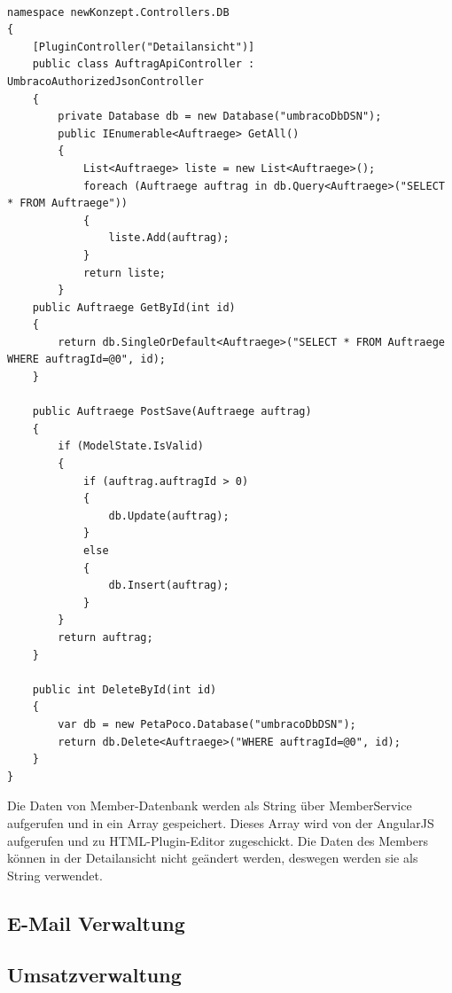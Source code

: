 \pagebreak
\begin{lstlisting}[caption={API-UmbracoAuthorizedJsonController}, label=lst:API-Controller]

namespace newKonzept.Controllers.DB
{
	[PluginController("Detailansicht")]
	public class AuftragApiController : UmbracoAuthorizedJsonController
	{
		private Database db = new Database("umbracoDbDSN");
		public IEnumerable<Auftraege> GetAll()
		{
			List<Auftraege> liste = new List<Auftraege>();
			foreach (Auftraege auftrag in db.Query<Auftraege>("SELECT * FROM Auftraege"))
			{
				liste.Add(auftrag);
			}
			return liste;
		}
	public Auftraege GetById(int id)
	{
		return db.SingleOrDefault<Auftraege>("SELECT * FROM Auftraege WHERE auftragId=@0", id);
	}

	public Auftraege PostSave(Auftraege auftrag)
	{
		if (ModelState.IsValid)
		{			
			if (auftrag.auftragId > 0)
			{
				db.Update(auftrag);
			}
			else
			{
				db.Insert(auftrag);
			}
		}
		return auftrag;
	}

	public int DeleteById(int id)
	{
		var db = new PetaPoco.Database("umbracoDbDSN");
		return db.Delete<Auftraege>("WHERE auftragId=@0", id);
	}
}
\end{lstlisting}

Die Daten von Member-Datenbank werden als String über MemberService aufgerufen und in ein Array gespeichert. Dieses Array wird von der AngularJS aufgerufen und zu HTML-Plugin-Editor zugeschickt. Die Daten des Members können in der Detailansicht nicht geändert werden, deswegen werden sie als String verwendet.

\subsection{E-Mail Verwaltung}
\subsection{Umsatzverwaltung}


